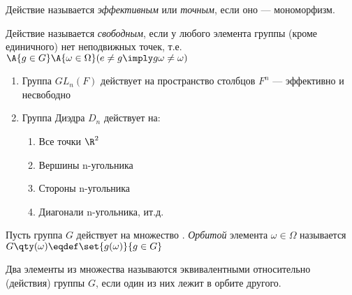 \begin{definition}
  Действие называется \emph{эффективным} или \emph{точным}, если оно --- мономорфизм.
\end{definition}

\begin{definition}
  \sloppy Действие называется \emph{свободным}, если у любого элемента группы (кроме единичного) нет неподвижных точек, т.\:е. $\A{g\in G}\A{\omega\in \Omega}(e\neq g\imply g\omega\neq \omega)$
\end{definition}

\begin{definition}

\end{definition}

\begin{examples}
  \theoremlistshack
  \begin{enumerate}
    \item Группа $GL_n(F)$ действует на пространство столбцов $F^n$ --- эффективно и несвободно
    \item Группа Диэдра $D_n$ действует на:
          \begin{enumerate}
            \item Все точки $\R^2$
            \item Вершины n-угольника
            \item Стороны n-угольника
            \item Диагонали n-угольника, и\:т.\:д.
          \end{enumerate}
  \end{enumerate}
\end{examples}

\begin{definition}
  Пусть группа $G$ действует на множество \Omega. \emph{Орбитой} элемента $\omega\in \Omega$ называется $G\qty(\omega)\eqdef\set{g(\omega)}{g\in G}$
\end{definition}

\begin{definition}
  Два элементы из множества \Omega называются эквивалентными относительно (действия) группы $G$, если один из них лежит в орбите другого.
\end{definition}

